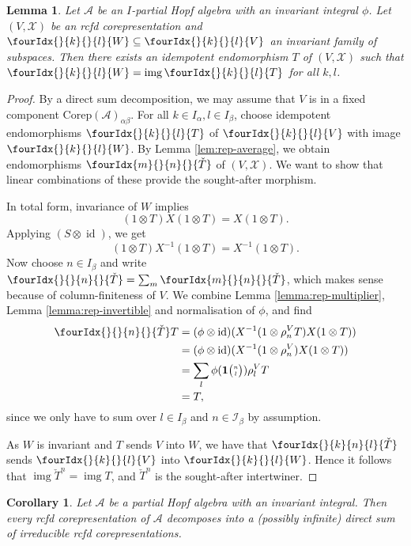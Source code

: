 \documentclass[10pt]{article}
\DeclareMathOperator{\id}{id}
\DeclareMathOperator{\img}{img}
\newcommand{\Corep}{\mathrm{Corep}}
\newcommand{\Grt}[3]{#1{\tiny {\begin{pmatrix} #2\\#3\end{pmatrix}}}}
\newcommand{\UnitC}[2]{\Grt{\mathbf{1}}{#1}{#2}}
\newcommand{\Gr}[5]{\fourIdx{#2}{#4}{#3}{#5}{#1}}%
\newcommand{\Gru}[3]{\Gr{#1}{}{}{#2}{#3}}
\newcommand{\Grd}[3]{\Gr{#1}{#2}{#3}{}{}}
\newtheorem{Lem}[Theorem]{Lemma}
\newtheorem{Cor}[Theorem]{Corollary}
\theoremstyle{definition}
\numberwithin{equation}{section}
\begin{document}
\begin{Lem}
  Let $\mathscr{A}$ be an $I$-partial Hopf algebra with an invariant integral $\phi$.
  Let $(V,\mathscr{X})$ be an rcfd corepresentation
  and $\Gru{W}{k}{l} \subseteq \Gru{V}{k}{l}$ an invariant family of
  subspaces. Then there exists an idempotent endomorphism $T$ of
  $(V,\mathscr{X})$ such that $\Gru{W}{k}{l}=\img\Gru{T}{k}{l}$ for
  all $k,l$.
\end{Lem}
\begin{proof}
By a direct sum decomposition, we may assume that $V$ is in a fixed component $\Corep(\mathscr{A})_{\alpha\beta}$. For all $k\in I_{\alpha},l\in I_{\beta}$, choose idempotent endomorphisms $\Gru{T}{k}{l}$ of $\Gru{V}{k}{l}$
  with image $\Gru{W}{k}{l}$. By Lemma \ref{lem:rep-average}, we obtain
  endomorphisms $\Grd{\check{T}}{m}{n}$ of $(V,\mathscr{X})$. We want to show
  that linear combinations of these provide the sought-after morphism.
  
    In
  total form, invariance of $W$ implies  \[(1 \otimes T)X(1
  \otimes T)=X(1\otimes T).\] Applying
 $(S \otimes \id)$, we get   \[(1 \otimes T)X^{-1}(1
  \otimes T)=X^{-1}(1\otimes T).\]
Now choose $n\in I_{\beta}$ and write $\Grd{\check{T}}{}{n} = \sum_m \Grd{\check{T}}{m}{n}$, which makes sense because of column-finiteness of $V$. We combine  Lemma
  \ref{lemma:rep-multiplier}, Lemma \ref{lemma:rep-invertible} and
  normalisation of $\phi$, and find
  \begin{align*}
    \Grd{\check{T}}{}{n} T &= (\phi \otimes \id)(X^{-1}(1 \otimes
    \rho_{n}^{V}T)X(1 \otimes T)) \\  &= 
     (\phi \otimes \id)(X^{-1}(1 \otimes
    \rho_{n}^{V})X(1 \otimes T)) \\
    &=
  \sum_l \phi(\UnitC{n}{l}) \rho^{V}_{l}T \\& =T,
  \end{align*}
 since we only have to sum over $l\in I_{\beta}$ and $n\in \mathscr{I}_{\beta}$ by assumption. 
 
 As $W$ is invariant and $T$ sends $V$ into $W$, we have that $\Gr{\check{T}}{}{n}{k}{l}$ sends $\Gru{V}{k}{l}$ into $\Gru{W}{k}{l}$. Hence it follows that $\img{\check{T}^{n}}=\img T$, and $\check{T}^{n}$ is the sought-after intertwiner.
\end{proof}

\begin{Cor}  \label{cor:rep-cosemisimple}%
  Let $\mathscr{A}$ be a partial Hopf algebra with an invariant integral.  Then
  every rcfd corepresentation of $\mathscr{A}$ decomposes into a (possibly infinite) direct
  sum of irreducible rcfd corepresentations.
\end{Cor} 
\end{document}
